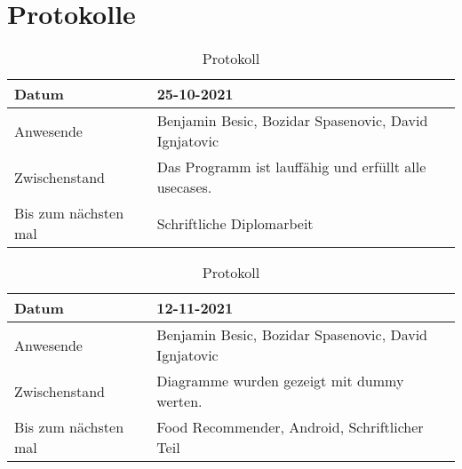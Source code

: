 \section{Protokolle}
\begin{table}
    
    \begin{tabular}{|p{3cm}|p{10cm}|  }
        \hline
        Datum & 25-10-2021\\
        \hline
        Anwesende & Benjamin Besic, Bozidar Spasenovic, David Ignjatovic\\
        \hline
        Zwischenstand&  Das Programm ist lauffähig und erfüllt alle usecases. \\
        \hline
        Bis zum nächsten mal &  Schriftliche Diplomarbeit\\
        \hline
        
    \end{tabular}
    \caption{Protokoll}
    \label{tab:my_label}
\end{table}
\begin{table}
    \begin{tabular}{ |p{3cm}|p{10cm}|   }
        \hline
        Datum & 12-11-2021\\
        \hline
        Anwesende & Benjamin Besic, Bozidar Spasenovic, David Ignjatovic\\
        \hline
        Zwischenstand& Diagramme wurden gezeigt mit dummy werten.\\
        \hline
        Bis zum nächsten mal &  Food Recommender, Android, Schriftlicher Teil \\
        \hline
    \end{tabular}
    \caption{Protokoll}
    \label{tab:my_label}
\end{table}


